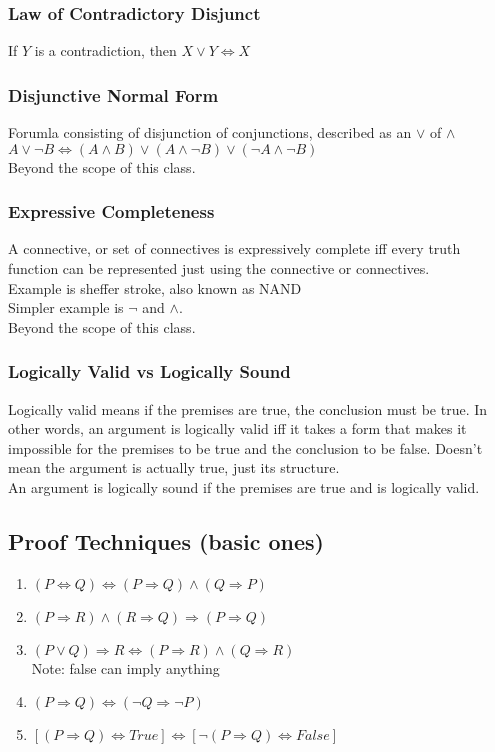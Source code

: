 \documentclass[11pt]{scrartcl}
\begin{document}
\subsubsection{Law of Contradictory Disjunct}
If $Y$ is a contradiction, then $X \lor Y \Leftrightarrow X$

\subsubsection{Disjunctive Normal Form}
Forumla consisting of disjunction of conjunctions, described as an $\lor$ of $\land$\\
$A \lor \lnot B \Leftrightarrow (A \land B)\lor(A \land \lnot B)\lor(\lnot A \land \lnot B)$\\
Beyond the scope of this class.
\subsubsection{Expressive Completeness}
A connective, or set of connectives is expressively complete iff every truth function can be represented just using the connective or connectives.\\
Example is sheffer stroke, also known as NAND\\ 
Simpler example is $\lnot$ and $\land$.\\
Beyond the scope of this class.
\subsubsection{Logically Valid vs Logically Sound}
Logically valid means if the premises are true, the conclusion must be true.
In other words, an argument is logically valid iff it takes a form that makes it impossible for the premises to be true and the conclusion to be false.
Doesn't mean the argument is actually true, just its structure.\\
An argument is logically sound if the premises are true and is logically valid.

\subsection{Proof Techniques (basic ones)}

\begin{enumerate}[i]
	\item $(P \Leftrightarrow Q) \Leftrightarrow (P \Rightarrow Q) \land (Q \Rightarrow P)$ 
	\item $(P \Rightarrow R) \land (R \Rightarrow Q) \Rightarrow (P \Rightarrow Q)$
	\item $(P \lor Q) \Rightarrow R \Leftrightarrow (P \Rightarrow R) \land (Q \Rightarrow R)$\\ Note: false can imply anything
	\item $(P \Rightarrow Q) \Leftrightarrow (\lnot Q \Rightarrow \lnot P)$
	\item $[(P \Rightarrow Q) \Leftrightarrow True] \Leftrightarrow [\lnot (P \Rightarrow Q) \Leftrightarrow False]$
\end{enumerate}
\end{document}
